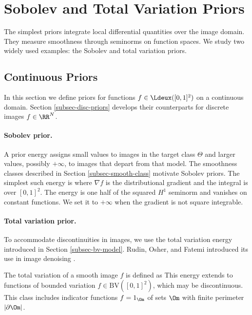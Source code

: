 \section{Sobolev and Total Variation Priors}
\label{sec-sob-tv-variational}

The simplest priors integrate local differential quantities over the image domain. They measure smoothness through seminorms on function spaces. We study two widely used examples: the Sobolev and total variation priors.

                                                                      
\subsection{Continuous Priors}
\label{sec-sob-tv-cont}

In this section we define priors for functions $f \in \Ldeux([0,1]^2)$ on a continuous domain. Section \ref{subsec-disc-priors} develops their counterparts for discrete images $f \in \RR^N$.

  
\paragraph{Sobolev prior.}

A prior energy assigns small values to images in the target class $\Theta$ and larger values, possibly $+\infty$, to images that depart from that model. The smoothness classes described in Section \ref{subsec-smooth-class} motivate Sobolev priors. The simplest such energy is
where $\nabla f$ is the distributional gradient and the integral is over $[0,1]^2$. The energy is one half of the squared $H^1$ seminorm and vanishes on constant functions. We set it to $+\infty$ when the gradient is not square integrable.

  
\paragraph{Total variation prior.}

To accommodate discontinuities in images, we use the total variation energy introduced in Section \ref{subsec-bv-model}. Rudin, Osher, and Fatemi introduced its use in image denoising \cite{rudin-tv}.

The total variation of a smooth image $f$ is defined as 
This energy extends to functions of bounded variation $f \in \text{BV}([0,1]^2)$, which may be discontinuous. This class includes indicator functions $f=1_{\Om}$ of sets $\Om$ with finite perimeter $|\partial \Om|$.

